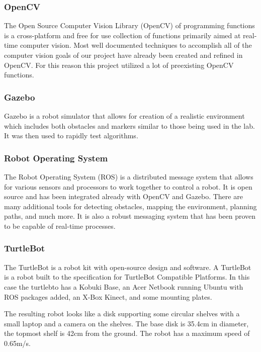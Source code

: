 \documentclass{article}
\begin{document}
		\subsubsection{OpenCV}
		
		The Open Source Computer Vision Library (OpenCV) of programming functions is a cross-platform and free for use collection of functions primarily aimed at real-time computer vision\cite{opencv}. Most well documented techniques to accomplish all of the computer vision goals of our project have already been created and refined in OpenCV. For this reason this project utilized a lot of preexisting OpenCV functions.
		
		\subsubsection{Gazebo}
		
		Gazebo is a robot simulator that allows for creation of a realistic environment which includes both obstacles and markers similar to those being used in the lab. It was then used to rapidly test algorithms.
		
		\subsubsection{Robot Operating System}
		
		The Robot Operating System (ROS) is a distributed message system that allows for various sensors and processors to work together to control a robot. It is open source and has been integrated already with OpenCV and Gazebo. There are many additional tools for detecting obstacles, mapping the environment, planning paths, and much more. It is also a robust messaging system that has been proven to be capable of real-time processes.
		
		\subsubsection{TurtleBot}
		
		The TurtleBot is a robot kit with open-source design and software. A TurtleBot is a robot built to the specification for TurtleBot Compatible Platforms\cite{wise_foote_2011}. In this case the turtlebto has a Kobuki Base, an Acer Netbook running Ubuntu with ROS packages added, an X-Box Kinect, and some mounting plates. 
		
		The resulting robot looks like a disk supporting some circular shelves with a small laptop and a camera on the shelves. The base disk is 35.4cm in diameter, the topmost shelf is 42cm from the ground. The robot has a maximum speed of 0.65m/s. 
		
\end{document}
